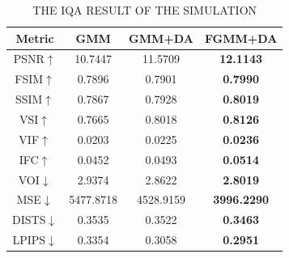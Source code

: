 \documentclass[conference]{IEEEtran}
\begin{document}
\begin{table}[!t]
    \centering  
    \caption{THE IQA RESULT OF THE SIMULATION}
    \label{tab2}
    \begin{tabular}{cccc}
    \toprule
    Metric & GMM & GMM+DA & \textbf{FGMM+DA} \\
    \midrule
    PSNR$\uparrow$ & 10.7447 & 11.5709 & \textbf{12.1143} \\
    FSIM$\uparrow$ & 0.7896 & 0.7901 & \textbf{0.7990} \\
    SSIM$\uparrow$ & 0.7867 & 0.7928 & \textbf{0.8019} \\
    VSI$\uparrow$ & 0.7665 & 0.8018 & \textbf{0.8126} \\
    VIF$\uparrow$ & 0.0203 & 0.0225 & \textbf{0.0236} \\
    IFC$\uparrow$ & 0.0452 & 0.0493 & \textbf{0.0514} \\
    VOI$\downarrow$ & 2.9374 & 2.8622 & \textbf{2.8019} \\
    MSE$\downarrow$ & 5477.8718 & 4528.9159 & \textbf{3996.2290} \\
    DISTS$\downarrow$ & 0.3535 & 0.3522 & \textbf{0.3463} \\
    LPIPS$\downarrow$ & 0.3354 & 0.3058 & \textbf{0.2951} \\
    \bottomrule
    \end{tabular}
\end{table}
\end{document}
